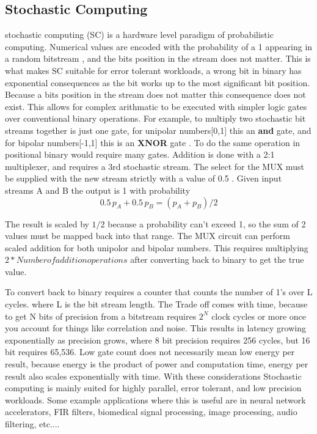 \documentclass[conference]{IEEEtran}
\begin{document}
\subsection{Stochastic Computing}
stochastic computing (SC) is a hardware level paradigm of probabilistic computing.
Numerical values are encoded with the probability of a 1 appearing in a random bitstream
\cite{stochastic_computing},
and the bits position in the stream does not matter. This is what makes SC suitable
for error tolerant workloads, a wrong bit in binary has exponential consequences as the
bit works up to the most significant bit position. Because a bits position in the
stream does not matter this consequence does not exist.
This allows for complex arithmatic 
to be executed with simpler logic gates over conventional binary operations. 
For example, to multiply two stochastic bit streams together is just one gate, 
for unipolar numbers[0,1] this an \textbf{and} gate, and 
for bipolar numbers[-1,1] this is an \textbf{XNOR} gate \cite{stochastic_computing_systems}. 
To do the same operation in positional binary would require many gates.
Addition is done with a 2:1 multiplexer, and requires a 3rd stochastic stream. The
select for the MUX must be supplied with the new stream strictly with a value of 0.5
\cite{stochastic_computing_systems}. Given input streams A and B the output is 1 
with probability \cite{stochastic_computing_systems}
\begin{equation}
    0.5\,p_A + 0.5\,p_B = (p_A + p_B)/2
\end{equation}

The result is scaled by $1/2$ because a probability can't exceed 1, so the sum of
2 values must be mapped back into that range. The MUX circuit can perform scaled addition
for both unipolor and bipolar numbers. This requires multiplying $2 * Number of addition operations$
after converting back to binary to get the true value.

To convert back to binary requires a counter that counts the number of 1's over L cycles.
where L is the bit stream length.
The Trade off comes with time, because to get N bits of precision from
a bitstream requires $2^N$ clock cycles or more once you account for things like correlation
and noise. This results in latency growing exponentially as precision grows, where
8 bit precision requires 256 cycles, but 16 bit requires 65,536. Low gate count
does not necessarily mean low energy per result, because energy is the product of
power and computation time, energy per result also scales exponentially with time.
With these considerations Stochastic computing is mainly suited for highly parallel,
error tolerant, and low precision workloads. \cite{manohar2015}
Some example applications where this is useful are in neural network accelerators\cite{nna},
FIR filters\cite{firfilters}, biomedical signal processing\cite{biomedical}, 
image processing\cite{imageprocessing}, audio filtering\cite{audiofiltering}, etc....
\end{document}
